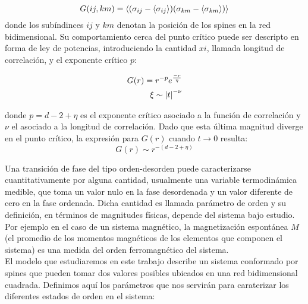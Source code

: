 \begin{equation}
	G(ij, km) = \langle (\sigma_{ij}-\langle \sigma_{ij} \rangle)(\sigma_{km}-\langle \sigma_{km} \rangle) \rangle 
	\label{eq:2dcorrfunct}
\end{equation}
donde los subíndinces $ij$ y $km$ denotan la posición de los spines en la red bidimensional.
Su comportamiento cerca del punto crítico puede ser descripto en forma de ley de potencias,
 introduciendo la cantidad $xi$, llamada longitud de correlación, y el exponente crítico $p$:
\begin{center} 
	\begin{eqnarray}
		\label{eq:expcrit_funccorr}
		G(r) = r^{-p}e^{\frac{-r}{\eta}}\\
		\label{eq:expcrit_longcorr}
		\xi\sim \left\vert t\right\vert^{-\nu}
	\end{eqnarray}
\end{center}
donde $p=d-2+\eta$ es el exponente crítico asociado a la función de correlación y
$\nu$ el asociado a la longitud de correlación. Dado que esta última magnitud
diverge en el punto crítico, la expresión para $G(r)$ cuando $t\rightarrow 0$
resulta:
\begin{equation}
	G(r)\sim r^{-(d-2+\eta)}
	\label{eq:corrfunct}
\end{equation}

Una transición de fase  del tipo orden-desorden puede caracterizarse cuantitativamente
 por alguna cantidad, usualmente una variable termodinámica medible, que toma un valor
 nulo en la fase desordenada y un valor diferente de cero en la fase ordenada.
 Dicha cantidad es llamada parámetro de orden y su definición, en términos de
 magnitudes físicas, depende del sistema bajo estudio. Por ejemplo en el caso
 de un sistema magnético, la magnetización espontánea $M$ (el promedio de los momentos magnéticos de los
 elementos que componen el sistema) es una medida del orden ferromagnético del
 sistema.\\
El modelo que estudiaremos en este trabajo describe un sistema conformado por spines
 que pueden tomar dos valores posibles ubicados en una red bidimensional cuadrada.
Definimos aquí los parámetros que nos servirán para caraterizar los diferentes
 estados de orden en el sistema:


